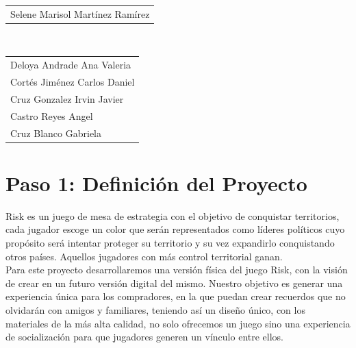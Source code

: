 \documentclass[12pt]{article}
\begin{document}
\begin{titlepage}
\begin{center}
\begin{tabular}{l}
\large Selene Marisol Martínez Ramírez \\[0.5cm]
\end{tabular}

\\[0.6cm]
\color{black}
\centering
\begin{tabular}{l}


\large Deloya Andrade Ana Valeria \\[0.4cm]

\large   Cortés Jiménez Carlos Daniel \\[0.4cm]

\large  Cruz Gonzalez Irvin Javier \\[0.4cm]

\large  Castro Reyes Angel  \\[0.4cm]

\large   Cruz Blanco Gabriela \\[0.4cm]
\end{tabular}

\vfill

\end{center}
\end{titlepage}

 \section*{Paso 1: Definición del Proyecto}

 \noindent Risk es un juego de mesa de estrategia con el objetivo de conquistar territorios, cada jugador escoge un color que serán representados como líderes políticos cuyo propósito será intentar proteger su territorio y su vez expandirlo conquistando otros países. Aquellos jugadores con más control territorial ganan. \\

 \noindent Para este proyecto desarrollaremos una versión física del juego Risk, con la visión de crear en un futuro versión digital del mismo. Nuestro objetivo es generar una experiencia única para los compradores, en la que puedan crear recuerdos que no olvidarán con amigos y familiares, teniendo así un diseño único, con los materiales de la más alta calidad, no solo ofrecemos un juego sino una experiencia de socialización para que jugadores generen un vínculo entre ellos.
\end{document}
